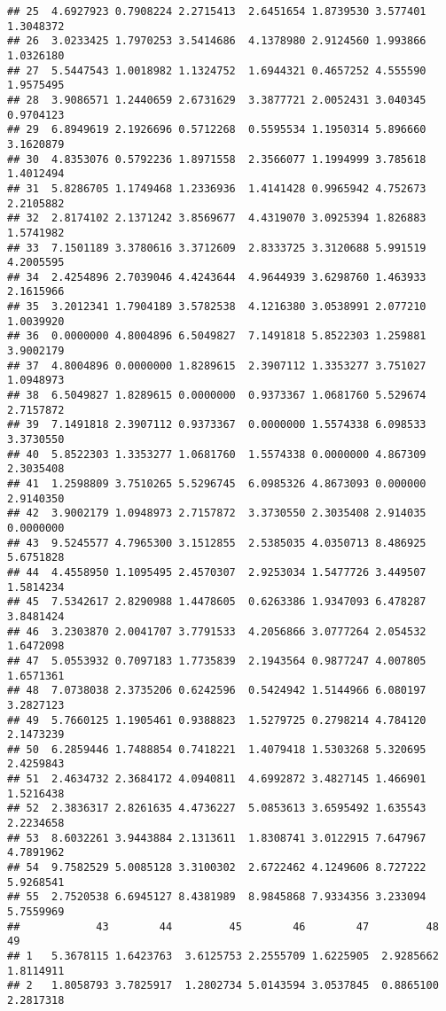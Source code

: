 \documentclass[
]{article}
\begin{document}
\begin{verbatim}
## 25  4.6927923 0.7908224 2.2715413  2.6451654 1.8739530 3.577401 1.3048372
## 26  3.0233425 1.7970253 3.5414686  4.1378980 2.9124560 1.993866 1.0326180
## 27  5.5447543 1.0018982 1.1324752  1.6944321 0.4657252 4.555590 1.9575495
## 28  3.9086571 1.2440659 2.6731629  3.3877721 2.0052431 3.040345 0.9704123
## 29  6.8949619 2.1926696 0.5712268  0.5595534 1.1950314 5.896660 3.1620879
## 30  4.8353076 0.5792236 1.8971558  2.3566077 1.1994999 3.785618 1.4012494
## 31  5.8286705 1.1749468 1.2336936  1.4141428 0.9965942 4.752673 2.2105882
## 32  2.8174102 2.1371242 3.8569677  4.4319070 3.0925394 1.826883 1.5741982
## 33  7.1501189 3.3780616 3.3712609  2.8333725 3.3120688 5.991519 4.2005595
## 34  2.4254896 2.7039046 4.4243644  4.9644939 3.6298760 1.463933 2.1615966
## 35  3.2012341 1.7904189 3.5782538  4.1216380 3.0538991 2.077210 1.0039920
## 36  0.0000000 4.8004896 6.5049827  7.1491818 5.8522303 1.259881 3.9002179
## 37  4.8004896 0.0000000 1.8289615  2.3907112 1.3353277 3.751027 1.0948973
## 38  6.5049827 1.8289615 0.0000000  0.9373367 1.0681760 5.529674 2.7157872
## 39  7.1491818 2.3907112 0.9373367  0.0000000 1.5574338 6.098533 3.3730550
## 40  5.8522303 1.3353277 1.0681760  1.5574338 0.0000000 4.867309 2.3035408
## 41  1.2598809 3.7510265 5.5296745  6.0985326 4.8673093 0.000000 2.9140350
## 42  3.9002179 1.0948973 2.7157872  3.3730550 2.3035408 2.914035 0.0000000
## 43  9.5245577 4.7965300 3.1512855  2.5385035 4.0350713 8.486925 5.6751828
## 44  4.4558950 1.1095495 2.4570307  2.9253034 1.5477726 3.449507 1.5814234
## 45  7.5342617 2.8290988 1.4478605  0.6263386 1.9347093 6.478287 3.8481424
## 46  3.2303870 2.0041707 3.7791533  4.2056866 3.0777264 2.054532 1.6472098
## 47  5.0553932 0.7097183 1.7735839  2.1943564 0.9877247 4.007805 1.6571361
## 48  7.0738038 2.3735206 0.6242596  0.5424942 1.5144966 6.080197 3.2827123
## 49  5.7660125 1.1905461 0.9388823  1.5279725 0.2798214 4.784120 2.1473239
## 50  6.2859446 1.7488854 0.7418221  1.4079418 1.5303268 5.320695 2.4259843
## 51  2.4634732 2.3684172 4.0940811  4.6992872 3.4827145 1.466901 1.5216438
## 52  2.3836317 2.8261635 4.4736227  5.0853613 3.6595492 1.635543 2.2234658
## 53  8.6032261 3.9443884 2.1313611  1.8308741 3.0122915 7.647967 4.7891962
## 54  9.7582529 5.0085128 3.3100302  2.6722462 4.1249606 8.727222 5.9268541
## 55  2.7520538 6.6945127 8.4381989  8.9845868 7.9334356 3.233094 5.7559969
##            43        44         45        46        47         48        49
## 1   5.3678115 1.6423763  3.6125753 2.2555709 1.6225905  2.9285662 1.8114911
## 2   1.8058793 3.7825917  1.2802734 5.0143594 3.0537845  0.8865100 2.2817318

\end{verbatim}
\end{document}
